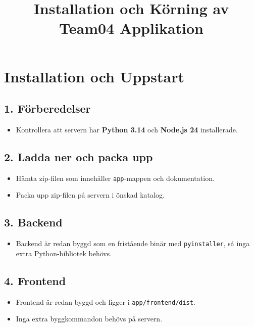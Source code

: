 \documentclass{article}
\title{Installation och Körning av Team04 Applikation}
\author{}
\date{}
\begin{document}
\maketitle

\section*{Installation och Uppstart}

\subsection*{1. Förberedelser}
\begin{itemize}[leftmargin=*]
    \item Kontrollera att servern har \textbf{Python 3.14} och \textbf{Node.js 24} installerade.
\end{itemize}

\subsection*{2. Ladda ner och packa upp}
\begin{itemize}[leftmargin=*]
    \item Hämta zip-filen som innehåller \texttt{app}-mappen och dokumentation.
    \item Packa upp zip-filen på servern i önskad katalog.
\end{itemize}

\subsection*{3. Backend}
\begin{itemize}[leftmargin=*]
    \item Backend är redan byggd som en fristående binär med \texttt{pyinstaller}, så inga extra Python-bibliotek behövs.
\end{itemize}

\subsection*{4. Frontend}
\begin{itemize}[leftmargin=*]
    \item Frontend är redan byggd och ligger i \texttt{app/frontend/dist}.
    \item Inga extra byggkommandon behövs på servern.
\end{itemize}
\end{document}
